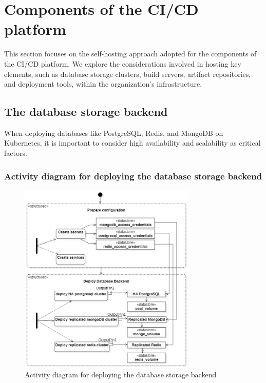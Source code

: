 \section{Components of the CI/CD platform }

\hspace{7mm}This section focuses on the self-hosting approach adopted for the components of the CI/CD platform. We explore the considerations involved in hosting key elements, such as database storage clusters, build servers, artifact repositories, and deployment tools, within the organization's infrastructure.

\subsection{The database storage backend }

\hspace{7mm}When deploying databases like PostgreSQL, Redis, and MongoDB on Kubernetes, it is important to consider high availability and scalability as critical factors. 

\subsubsection{Activity diagram for deploying the database storage backend }
\begin{figure}[H]\centering
\includegraphics[width=0.75\textwidth,angle=00]{assets/f35.png}
\caption{Activity diagram for deploying the database storage backend}
\label{fig:Activity diagram for deploying the database storage backend}
\end{figure}


